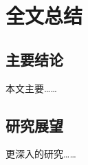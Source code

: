 \documentclass[UTF8,a4paper,12pt]{ctexart}
\numberwithin{equation}{section}
\begin{document}
\section{全文总结}

\subsection{主要结论}
本文主要……

\subsection{研究展望}
更深入的研究……

\newpage


\renewcommand\refname{参\quad考\quad文\quad献}
\begin{spacing}{1.2} %
	 \songti
	
	\vspace{11bp}
\end{spacing}


\newpage
\end{document}
